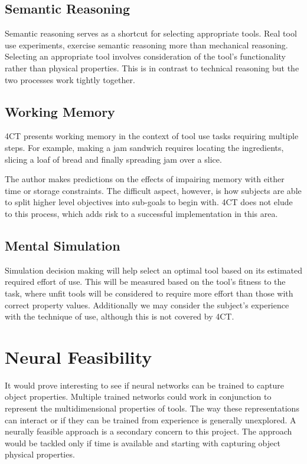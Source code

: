 \documentclass[11]{article}
\begin{document}
\subsection{Semantic Reasoning}

Semantic reasoning serves as a shortcut for selecting appropriate tools. Real tool use experiments, exercise semantic reasoning more than mechanical reasoning. Selecting an appropriate tool involves consideration of the tool's functionality rather than physical properties. This is in contrast to technical reasoning but the two processes work tightly together. 


\subsection{Working Memory}

4CT presents working memory in the context of tool use tasks requiring multiple steps. For example, making a jam sandwich requires locating the ingredients, slicing a loaf of bread and finally spreading jam over a slice\cite{osiurak2014}. 

The author makes predictions on the effects of impairing memory with either time or storage constraints\cite{osiurak2014}. The difficult aspect, however, is how subjects are able to split higher level objectives into sub-goals to begin with. 4CT does not elude to this process, which adds risk to a successful implementation in this area. 

\subsection{Mental Simulation}

Simulation decision making will help select an optimal tool based on its estimated required effort of use. This will be measured based on the tool's fitness to the task, where unfit tools will be considered to require more effort than those with correct property values. Additionally we may consider the subject's experience with the technique of use, although this is not covered by 4CT.

\section{Neural Feasibility}
It would prove interesting to see if neural networks can be trained to capture object properties. Multiple trained networks could work in conjunction to represent the multidimensional properties of tools. The way these representations can interact or if they can be trained from experience is generally unexplored. A neurally feasible approach is a secondary concern to this project. The approach would be tackled only if time is available and starting with capturing object physical properties. 
\end{document}
